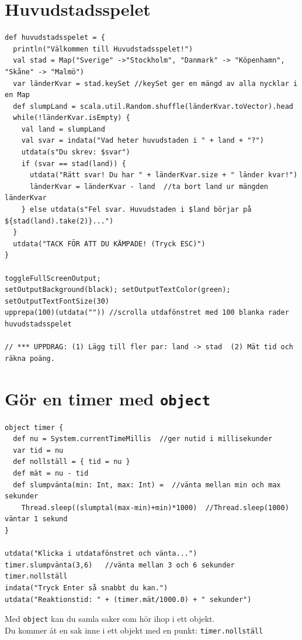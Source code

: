 \chapter{Huvudstadsspelet}
\begin{lstlisting}[basicstyle={\ttfamily\fontsize{13}{16}\selectfont},numbers=none]
def huvudstadsspelet = {
  println("Välkommen till Huvudstadsspelet!")
  val stad = Map("Sverige" ->"Stockholm", "Danmark" -> "Köpenhamn", "Skåne" -> "Malmö")
  var länderKvar = stad.keySet //keySet ger en mängd av alla nycklar i en Map 
  def slumpLand = scala.util.Random.shuffle(länderKvar.toVector).head
  while(!länderKvar.isEmpty) {
    val land = slumpLand
    val svar = indata("Vad heter huvudstaden i " + land + "?")
    utdata(s"Du skrev: $svar")
    if (svar == stad(land)) {
      utdata("Rätt svar! Du har " + länderKvar.size + " länder kvar!")
      länderKvar = länderKvar - land  //ta bort land ur mängden länderKvar
    } else utdata(s"Fel svar. Huvudstaden i $land börjar på ${stad(land).take(2)}...")
  }
  utdata("TACK FÖR ATT DU KÄMPADE! (Tryck ESC)")
}

toggleFullScreenOutput;  
setOutputBackground(black); setOutputTextColor(green); setOutputTextFontSize(30)
upprepa(100)(utdata("")) //scrolla utdafönstret med 100 blanka rader
huvudstadsspelet

// *** UPPDRAG: (1) Lägg till fler par: land -> stad  (2) Mät tid och räkna poäng.
\end{lstlisting}
        
\chapter{Gör en timer med \lstinline{object}}
\begin{lstlisting}[basicstyle={\ttfamily\fontsize{14}{17}\selectfont},numbers=none]
object timer {
  def nu = System.currentTimeMillis  //ger nutid i millisekunder
  var tid = nu
  def nollställ = { tid = nu }
  def mät = nu - tid
  def slumpvänta(min: Int, max: Int) =  //vänta mellan min och max sekunder
    Thread.sleep((slumptal(max-min)+min)*1000)  //Thread.sleep(1000) väntar 1 sekund
}

utdata("Klicka i utdatafönstret och vänta...")
timer.slumpvänta(3,6)   //vänta mellan 3 och 6 sekunder
timer.nollställ
indata("Tryck Enter så snabbt du kan.")
utdata("Reaktionstid: " + (timer.mät/1000.0) + " sekunder")
\end{lstlisting}
        
Med \lstinline{object} kan du samla saker som hör ihop i ett objekt.\\
Du kommer åt en sak inne i ett objekt med en punkt: \lstinline{timer.nollställ}
